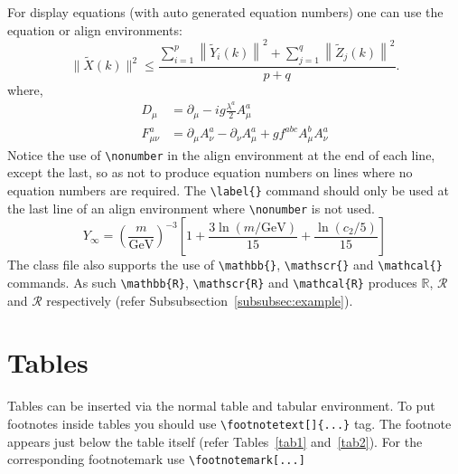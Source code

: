 \documentclass[pdflatex,sn-mathphys]{sn-jnl}%
\theoremstyle{thmstyleone}%
\theoremstyle{thmstyletwo}%
\theoremstyle{thmstylethree}%
\begin{document}
For display equations (with auto generated equation numbers)
one can use the equation or align environments:
\begin{equation}
  \|\tilde{X}(k)\|^2 \leq\frac{\sum\limits_{i=1}^{p}\left\|\tilde{Y}_i(k)\right\|^2+\sum\limits_{j=1}^{q}\left\|\tilde{Z}_j(k)\right\|^2 }{p+q}.
  \label{eq:eq1}
\end{equation}
where,
\begin{align}
  D_\mu &=  \partial_\mu - ig \frac{\lambda^a}{2} A^a_\mu \nonumber \\
  F^a_{\mu\nu} &= \partial_\mu A^a_\nu - \partial_\nu A^a_\mu + g f^{abc} A^b_\mu A^a_\nu \label{eq2}
\end{align}
Notice the use of \verb+\nonumber+ in the align environment at the end of each line, except the last, so as not to produce equation numbers on lines where no equation numbers are required.
The \verb+\label{}+ command should only be used at the last line of an align environment where
\verb+\nonumber+ is not used.
\begin{equation}
  Y_\infty = \left( \frac{m}{\textrm{GeV}} \right)^{-3}
      \left[ 1 + \frac{3 \ln(m/\textrm{GeV})}{15}
      + \frac{\ln(c_2/5)}{15} \right]
  \label{eq:sq2}
\end{equation}
The class file also supports the use of \verb+\mathbb{}+, \verb+\mathscr{}+ and \verb+\mathcal{}+ commands.
As such \verb+\mathbb{R}+, \verb+\mathscr{R}+ and \verb+\mathcal{R}+ produces $\mathbb{R}$, $\mathscr{R}$ and $\mathcal{R}$ respectively (refer Subsubsection~\ref{subsubsec:example}).



\section{Tables}
\label{sec:tables}

Tables can be inserted via the normal table and tabular environment.
To put footnotes inside tables you should use \verb+\footnotetext[]{...}+ tag.
The footnote appears just below the table itself (refer Tables~\ref{tab1} and~\ref{tab2}).
For the corresponding footnotemark use \verb+\footnotemark[...]+
\end{document}

